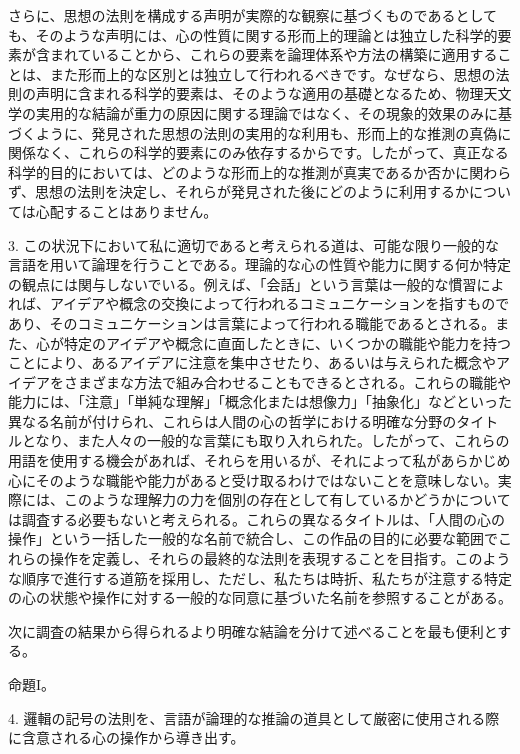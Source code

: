 \documentclass[a4paper,11pt,openany]{ltjsbook}
\begin{document}
さらに、思想の法則を構成する声明が実際的な観察に基づくものであるとしても、そのような声明には、心の性質に関する形而上的理論とは独立した科学的要素が含まれていることから、これらの要素を論理体系や方法の構築に適用することは、また形而上的な区別とは独立して行われるべきです。なぜなら、思想の法則の声明に含まれる科学的要素は、そのような適用の基礎となるため、物理天文学の実用的な結論が重力の原因に関する理論ではなく、その現象的效果のみに基づくように、発見された思想の法則の実用的な利用も、形而上的な推測の真偽に関係なく、これらの科学的要素にのみ依存するからです。したがって、真正なる科学的目的においては、どのような形而上的な推測が真実であるか否かに関わらず、思想の法則を決定し、それらが発見された後にどのように利用するかについては心配することはありません。

3. この状況下において私に適切であると考えられる道は、可能な限り一般的な言語を用いて論理を行うことである。理論的な心の性質や能力に関する何か特定の観点には関与しないでいる。例えば、「会話」という言葉は一般的な慣習によれば、アイデアや概念の交換によって行われるコミュニケーションを指すものであり、そのコミュニケーションは言葉によって行われる職能であるとされる。また、心が特定のアイデアや概念に直面したときに、いくつかの職能や能力を持つことにより、あるアイデアに注意を集中させたり、あるいは与えられた概念やアイデアをさまざまな方法で組み合わせることもできるとされる。これらの職能や能力には、「注意」「単純な理解」「概念化または想像力」「抽象化」などといった異なる名前が付けられ、これらは人間の心の哲学における明確な分野のタイトルとなり、また人々の一般的な言葉にも取り入れられた。したがって、これらの用語を使用する機会があれば、それらを用いるが、それによって私があらかじめ心にそのような職能や能力があると受け取るわけではないことを意味しない。実際には、このような理解力の力を個別の存在として有しているかどうかについては調査する必要もないと考えられる。これらの異なるタイトルは、「人間の心の操作」という一括した一般的な名前で統合し、この作品の目的に必要な範囲でこれらの操作を定義し、それらの最終的な法則を表現することを目指す。このような順序で進行する道筋を採用し、ただし、私たちは時折、私たちが注意する特定の心の状態や操作に対する一般的な同意に基づいた名前を参照することがある。

次に調査の結果から得られるより明確な結論を分けて述べることを最も便利とする。

\begin{center}
\textsc{命題I。}
\end{center}

4. 邏輯の記号の法則を、言語が論理的な推論の道具として厳密に使用される際に含意される心の操作から導き出す。
\end{document}
